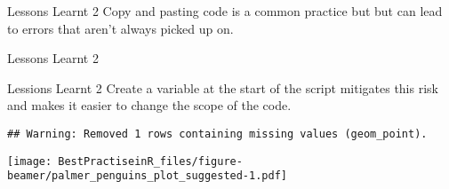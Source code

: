 \documentclass[
  ignorenonframetext,
]{beamer}
\newenvironment{Shaded}{\begin{snugshade}}{\end{snugshade}}
\newcommand{\AttributeTok}[1]{\textcolor[rgb]{0.77,0.63,0.00}{#1}}
\newcommand{\DecValTok}[1]{\textcolor[rgb]{0.00,0.00,0.81}{#1}}
\newcommand{\FunctionTok}[1]{\textcolor[rgb]{0.00,0.00,0.00}{#1}}
\newcommand{\NormalTok}[1]{#1}
\newcommand{\OtherTok}[1]{\textcolor[rgb]{0.56,0.35,0.01}{#1}}
\newcommand{\SpecialCharTok}[1]{\textcolor[rgb]{0.00,0.00,0.00}{#1}}
\newcommand{\StringTok}[1]{\textcolor[rgb]{0.31,0.60,0.02}{#1}}
\begin{document}
\begin{frame}[fragile]{Lessons Learnt 2}
\protect\hypertarget{lessons-learnt-2-2}{}
Copy and pasting code is a common practice but but can lead to errors
that aren't always picked up on.

\begin{Shaded}
\end{Shaded}
\end{frame}

\begin{frame}{Lessons Learnt 2}
\protect\hypertarget{lessons-learnt-2-3}{}
\end{frame}

\begin{frame}[fragile]{Lessions Learnt 2}
\protect\hypertarget{lessions-learnt-2}{}
Create a variable at the start of the script mitigates this risk and
makes it easier to change the scope of the code.

\begin{verbatim}
## Warning: Removed 1 rows containing missing values (geom_point).
\end{verbatim}

\texttt{[image: BestPractiseinR\_files/figure-beamer/palmer\_penguins\_plot\_suggested-1.pdf]}
\end{frame}
\end{document}
